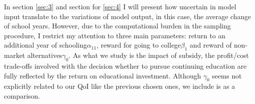 \noindent
In section \ref{sec:3} and section for \ref{sec:4} I will present how uncertain in model input translate to the variations of model output, in this case, the average change of school years. However, due to the computational burden in the sampling procedure, I restrict my attention to three main parameters: return to an additional year of schooling$\alpha_{11}$, reward for going to college$\beta_1$ and reward of non-market alternatives$\gamma_0$. As what we study is the impact of subsidy, the profit/cost trade-offs involved with the decision whether to pursue continuing education are fully reflected by the return on educational investment. Although $\gamma_0$ seems not explicitly related to our QoI like the previous chosen ones, we include is as a comparison.
